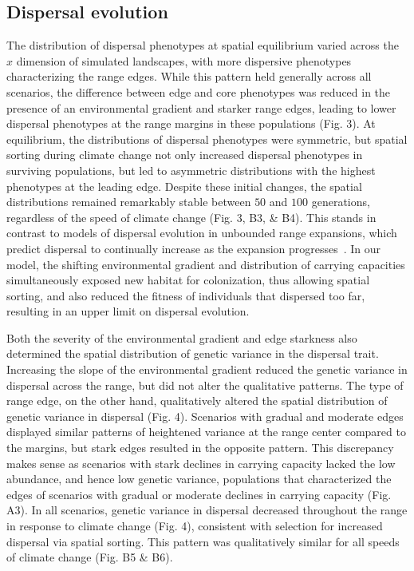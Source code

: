 \documentclass[11pt]{article}
\begin{document}
\subsection*{Dispersal evolution} 
The distribution of dispersal phenotypes at spatial equilibrium varied across the $x$ dimension of simulated landscapes, with more dispersive phenotypes characterizing the range edges. While this pattern held generally across all scenarios, the difference between edge and core phenotypes was reduced in the presence of an environmental gradient and starker range edges, leading to lower dispersal phenotypes at the range margins in these populations (Fig. 3). At equilibrium, the distributions of dispersal phenotypes were symmetric, but spatial sorting during climate change not only increased dispersal phenotypes in surviving populations, but led to asymmetric distributions with the highest phenotypes at the leading edge. Despite these initial changes, the spatial distributions remained remarkably stable between $50$ and $100$ generations, regardless of the speed of climate change (Fig. 3, B3, \& B4). This stands in contrast to models of dispersal evolution in unbounded range expansions, which predict dispersal to continually increase as the expansion progresses~\citep{shaw2015dispersal, shine2011evolutionary, fronhofer2015eco}. In our model, the shifting environmental gradient and distribution of carrying capacities simultaneously exposed new habitat for colonization, thus allowing spatial sorting, and also reduced the fitness of individuals that dispersed too far, resulting in an upper limit on dispersal evolution.

Both the severity of the environmental gradient and edge starkness also determined the spatial distribution of genetic variance in the dispersal trait. Increasing the slope of the environmental gradient reduced the genetic variance in dispersal across the range, but did not alter the qualitative patterns. The type of range edge, on the other hand, qualitatively altered the spatial distribution of genetic variance in dispersal (Fig. 4). Scenarios with gradual and moderate edges displayed similar patterns of heightened variance at the range center compared to the margins, but stark edges resulted in the opposite pattern. This discrepancy makes sense as scenarios with stark declines in carrying capacity lacked the low abundance, and hence low genetic variance, populations that characterized the edges of scenarios with gradual or moderate declines in carrying capacity (Fig. A3). In all scenarios, genetic variance in dispersal decreased throughout the range in response to climate change (Fig. 4), consistent with selection for increased dispersal via spatial sorting. This pattern was qualitatively similar for all speeds of climate change (Fig. B5 \& B6).
\end{document}
